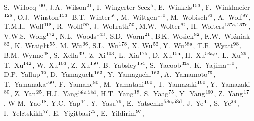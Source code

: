 \begin{flushleft}
S.~Willocq$^\textrm{\scriptsize 100}$,    
J.A.~Wilson$^\textrm{\scriptsize 21}$,    
I.~Wingerter-Seez$^\textrm{\scriptsize 5}$,    
E.~Winkels$^\textrm{\scriptsize 153}$,    
F.~Winklmeier$^\textrm{\scriptsize 128}$,    
O.J.~Winston$^\textrm{\scriptsize 153}$,    
B.T.~Winter$^\textrm{\scriptsize 50}$,    
M.~Wittgen$^\textrm{\scriptsize 150}$,    
M.~Wobisch$^\textrm{\scriptsize 93}$,    
A.~Wolf$^\textrm{\scriptsize 97}$,    
T.M.H.~Wolf$^\textrm{\scriptsize 118}$,    
R.~Wolff$^\textrm{\scriptsize 99}$,    
J.~Wollrath$^\textrm{\scriptsize 50}$,    
M.W.~Wolter$^\textrm{\scriptsize 82}$,    
H.~Wolters$^\textrm{\scriptsize 137a,137c}$,    
V.W.S.~Wong$^\textrm{\scriptsize 172}$,    
N.L.~Woods$^\textrm{\scriptsize 143}$,    
S.D.~Worm$^\textrm{\scriptsize 21}$,    
B.K.~Wosiek$^\textrm{\scriptsize 82}$,    
K.W.~Wo\'{z}niak$^\textrm{\scriptsize 82}$,    
K.~Wraight$^\textrm{\scriptsize 55}$,    
M.~Wu$^\textrm{\scriptsize 36}$,    
S.L.~Wu$^\textrm{\scriptsize 178}$,    
X.~Wu$^\textrm{\scriptsize 52}$,    
Y.~Wu$^\textrm{\scriptsize 58a}$,    
T.R.~Wyatt$^\textrm{\scriptsize 98}$,    
B.M.~Wynne$^\textrm{\scriptsize 48}$,    
S.~Xella$^\textrm{\scriptsize 39}$,    
Z.~Xi$^\textrm{\scriptsize 103}$,    
L.~Xia$^\textrm{\scriptsize 175}$,    
D.~Xu$^\textrm{\scriptsize 15a}$,    
H.~Xu$^\textrm{\scriptsize 58a,e}$,    
L.~Xu$^\textrm{\scriptsize 29}$,    
T.~Xu$^\textrm{\scriptsize 142}$,    
W.~Xu$^\textrm{\scriptsize 103}$,    
Z.~Xu$^\textrm{\scriptsize 150}$,    
B.~Yabsley$^\textrm{\scriptsize 154}$,    
S.~Yacoob$^\textrm{\scriptsize 32a}$,    
K.~Yajima$^\textrm{\scriptsize 130}$,    
D.P.~Yallup$^\textrm{\scriptsize 92}$,    
D.~Yamaguchi$^\textrm{\scriptsize 162}$,    
Y.~Yamaguchi$^\textrm{\scriptsize 162}$,    
A.~Yamamoto$^\textrm{\scriptsize 79}$,    
T.~Yamanaka$^\textrm{\scriptsize 160}$,    
F.~Yamane$^\textrm{\scriptsize 80}$,    
M.~Yamatani$^\textrm{\scriptsize 160}$,    
T.~Yamazaki$^\textrm{\scriptsize 160}$,    
Y.~Yamazaki$^\textrm{\scriptsize 80}$,    
Z.~Yan$^\textrm{\scriptsize 25}$,    
H.J.~Yang$^\textrm{\scriptsize 58c,58d}$,    
H.T.~Yang$^\textrm{\scriptsize 18}$,    
S.~Yang$^\textrm{\scriptsize 75}$,    
Y.~Yang$^\textrm{\scriptsize 160}$,    
Z.~Yang$^\textrm{\scriptsize 17}$,    
W-M.~Yao$^\textrm{\scriptsize 18}$,    
Y.C.~Yap$^\textrm{\scriptsize 44}$,    
Y.~Yasu$^\textrm{\scriptsize 79}$,    
E.~Yatsenko$^\textrm{\scriptsize 58c,58d}$,    
J.~Ye$^\textrm{\scriptsize 41}$,    
S.~Ye$^\textrm{\scriptsize 29}$,    
I.~Yeletskikh$^\textrm{\scriptsize 77}$,    
E.~Yigitbasi$^\textrm{\scriptsize 25}$,    
E.~Yildirim$^\textrm{\scriptsize 97}$,    

\end{flushleft}
